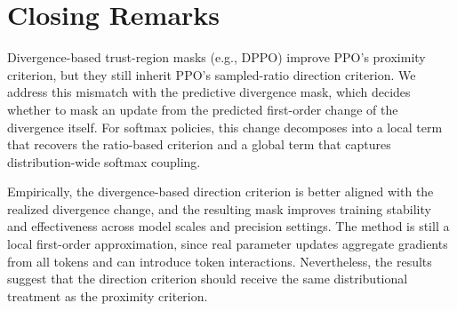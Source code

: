 \section{Closing Remarks}

Divergence-based trust-region masks (e.g., DPPO) improve PPO's proximity criterion, but they
still inherit PPO's sampled-ratio direction criterion.
We address this mismatch with the predictive divergence mask, which decides
whether to mask an update from the predicted first-order change of the divergence
itself.
For softmax policies, this change decomposes into a local term that recovers the
ratio-based criterion and a global term that captures distribution-wide softmax
coupling.

Empirically, the divergence-based direction criterion is better aligned with the
realized divergence change, and the resulting mask improves
training stability and effectiveness across model scales and precision settings.
The method is still a local first-order approximation, since real parameter
updates aggregate gradients from all tokens and can introduce token interactions.
Nevertheless, the results suggest that the direction criterion should receive the
same distributional treatment as the proximity criterion.
